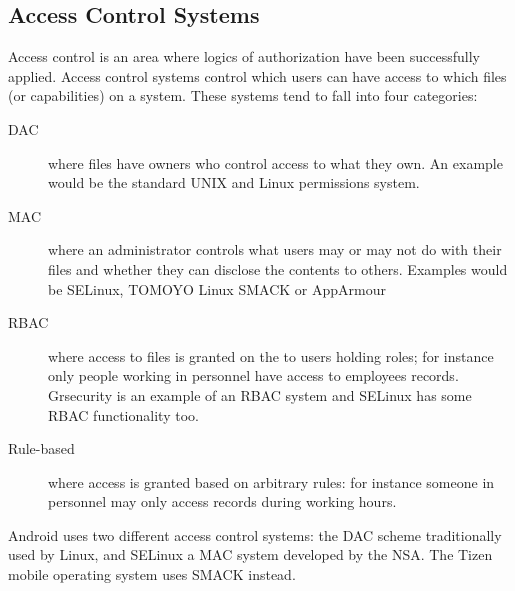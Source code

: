 \documentclass[a4paper]{article}
\begin{document}
\begin{algorithm}[H]
\end{algorithm}



\subsection{Access Control Systems}

Access control is an area where logics of authorization have been successfully
applied.  Access control systems control which users can have access to which
files (or capabilities) on a system.  These systems tend to fall into four categories:

\begin{description}
  \item[\ac{DAC}] where files have owners who control access to what they own.
    An example would be the standard UNIX and Linux permissions system.
  \item[\ac{MAC}] where an administrator controls what users may or may not do
    with their files and whether they can disclose the contents to others.
    Examples would be SELinux, TOMOYO Linux SMACK or AppArmour
  \item[\ac{RBAC}] where access to files is granted on the to users holding
    roles; for instance only people working in personnel have access to
    employees records.  Grsecurity is an example of an \ac{RBAC} system and SELinux has some \ac{RBAC} functionality too.
  \item[Rule-based] where access is granted based on arbitrary rules: for
    instance someone in personnel may only access records during working hours.
\end{description}

Android uses two different access control systems: the
\ac{DAC} scheme traditionally used by Linux, and SELinux a \ac{MAC} system
developed by the NSA.  The Tizen mobile
operating system uses SMACK instead.
\end{document}
